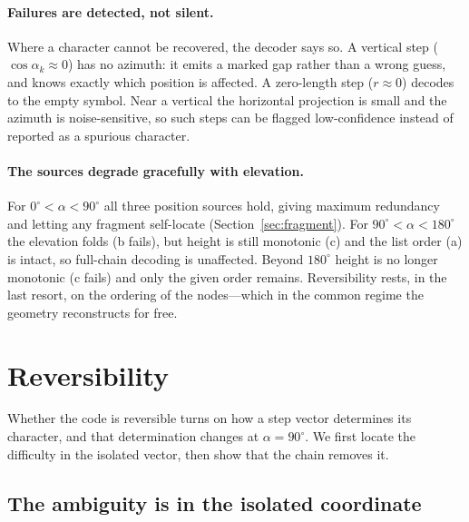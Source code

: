 \documentclass[11pt]{article}
\renewcommand{\deg}{^{\circ}}  %
\begin{document}
\paragraph{Failures are detected, not silent.} Where a character cannot be recovered, the
decoder says so. A vertical step ($\cos\alpha_k\approx 0$) has no azimuth: it emits a marked
gap rather than a wrong guess, and knows exactly which position is affected. A zero-length
step ($r\approx 0$) decodes to the empty symbol. Near a vertical the horizontal projection is
small and the azimuth is noise-sensitive, so such steps can be flagged low-confidence instead
of reported as a spurious character.

\paragraph{The sources degrade gracefully with elevation.} For $0\deg<\alpha<90\deg$ all
three position sources hold, giving maximum redundancy and letting any fragment self-locate
(Section~\ref{sec:fragment}). For $90\deg<\alpha<180\deg$ the elevation folds (b fails), but
height is still monotonic (c) and the list order (a) is intact, so full-chain decoding is
unaffected. Beyond $180\deg$ height is no longer monotonic (c fails) and only the given order
remains. Reversibility rests, in the last resort, on the ordering of the nodes---which in the
common regime the geometry reconstructs for free.

\section{Reversibility}\label{sec:reversibility}

Whether the code is reversible turns on how a step vector determines its character, and that
determination changes at $\alpha=90\deg$. We first locate the difficulty in the isolated
vector, then show that the chain removes it.

\subsection{The ambiguity is in the isolated coordinate}
\end{document}
